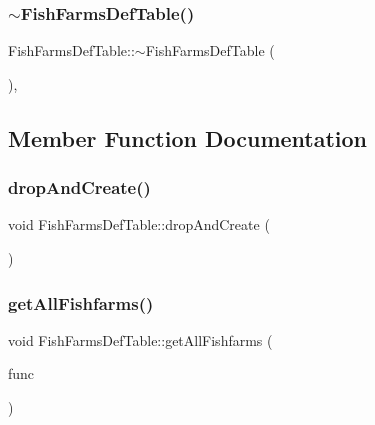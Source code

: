 \subsubsection{\texorpdfstring{$\sim$FishFarmsDefTable()}{~FishFarmsDefTable()}}
{\footnotesize\ttfamily Fish\+Farms\+Def\+Table\+::$\sim$\+Fish\+Farms\+Def\+Table (\begin{DoxyParamCaption}{ }\end{DoxyParamCaption})\hspace{0.3cm}{\ttfamily [default]}, {\ttfamily [noexcept]}}



\subsection{Member Function Documentation}
\mbox{\label{class_fish_farms_def_table_a9315e3a212b9ec4ccd0a2cc2ee02830e}} 
\subsubsection{\texorpdfstring{dropAndCreate()}{dropAndCreate()}}
{\footnotesize\ttfamily void Fish\+Farms\+Def\+Table\+::drop\+And\+Create (\begin{DoxyParamCaption}{ }\end{DoxyParamCaption})}

\mbox{\label{class_fish_farms_def_table_ac6fc8c8cfb19b252cf28c0e0cc142573}} 
\subsubsection{\texorpdfstring{getAllFishfarms()}{getAllFishfarms()}}
{\footnotesize\ttfamily void Fish\+Farms\+Def\+Table\+::get\+All\+Fishfarms (\begin{DoxyParamCaption}\item[{\mbox{\hyperlink{class_fish_farms_def_table_aeab850ebda904be43b0b690c789a56b9}{Fish\+Farms\+Def\+Table\+::\+Fishfarm\+Select\+Func}}}]{func }\end{DoxyParamCaption})}

\mbox{\label{class_fish_farms_def_table_afc739c5179b900178a1c374e99ece7ca}} 
